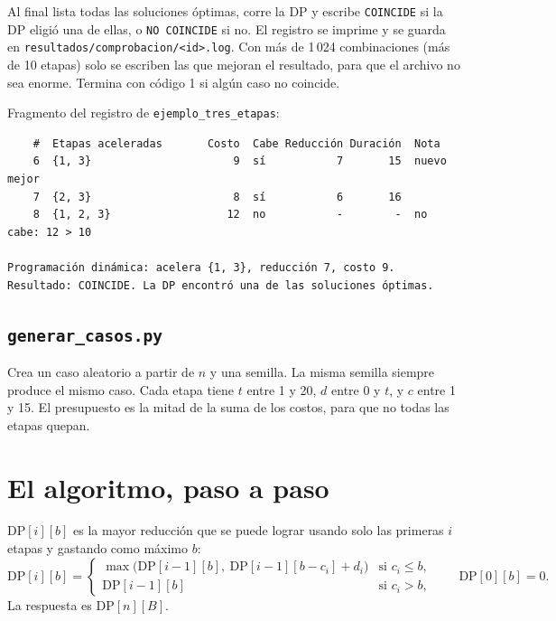 \documentclass[11pt,a4paper]{article}
\newcommand{\cod}[1]{\texttt{#1}}
\newcommand{\DP}[2]{\mathrm{DP}[#1][#2]}
\begin{document}
Al final lista todas las soluciones óptimas, corre la DP y escribe \cod{COINCIDE} si la DP eligió una de ellas, o \cod{NO COINCIDE} si no. El registro se imprime y se guarda en \cod{resultados/comprobacion/<id>.log}. Con más de 1\,024 combinaciones (más de 10 etapas) solo se escriben las que mejoran el resultado, para que el archivo no sea enorme. Termina con código 1 si algún caso no coincide.

Fragmento del registro de \cod{ejemplo\_tres\_etapas}:

\begin{lstlisting}
    #  Etapas aceleradas       Costo  Cabe Reducción Duración  Nota
    6  {1, 3}                      9  sí           7       15  nuevo mejor
    7  {2, 3}                      8  sí           6       16
    8  {1, 2, 3}                  12  no           -        -  no cabe: 12 > 10

Programación dinámica: acelera {1, 3}, reducción 7, costo 9.
Resultado: COINCIDE. La DP encontró una de las soluciones óptimas.
\end{lstlisting}

\subsection{\cod{generar\_casos.py}}

Crea un caso aleatorio a partir de $n$ y una semilla. La misma semilla siempre produce el mismo caso. Cada etapa tiene $t$ entre 1 y 20, $d$ entre 0 y $t$, y $c$ entre 1 y 15. El presupuesto es la mitad de la suma de los costos, para que no todas las etapas quepan.

\section{El algoritmo, paso a paso}
\label{sec:algoritmo}

$\DP{i}{b}$ es la mayor reducción que se puede lograr usando solo las primeras $i$ etapas y gastando como máximo $b$:
\begin{equation*}
  \DP{i}{b}=
  \begin{cases}
    \max\bigl(\DP{i-1}{b},\ \DP{i-1}{b-c_i}+d_i\bigr) & \text{si } c_i\le b,\\
    \DP{i-1}{b} & \text{si } c_i>b,
  \end{cases}
  \qquad \DP{0}{b}=0.
\end{equation*}
La respuesta es $\DP{n}{B}$.
\end{document}
